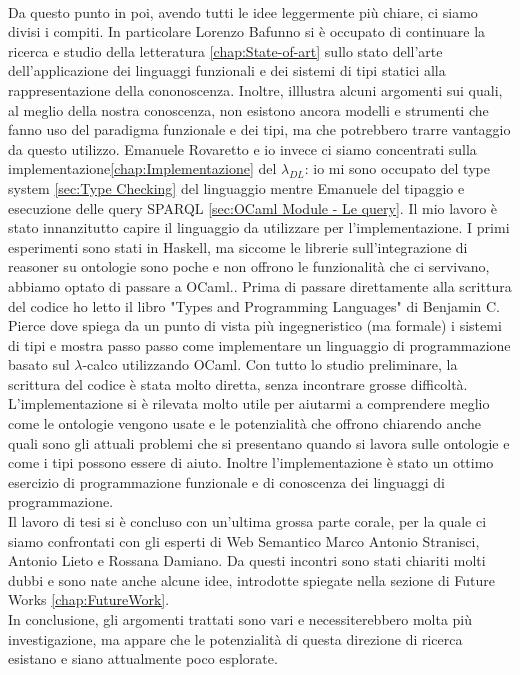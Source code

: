 \\Da questo punto in poi, avendo tutti le idee leggermente più chiare, ci siamo divisi i compiti. In particolare Lorenzo Bafunno si
è occupato di continuare la ricerca e studio della letteratura \ref{chap:State-of-art} sullo stato dell'arte dell'applicazione dei linguaggi funzionali e dei sistemi di tipi statici alla rappresentazione della cononoscenza. Inoltre, illlustra alcuni argomenti sui quali, al meglio della nostra conoscenza, non esistono ancora modelli e strumenti che fanno uso del paradigma funzionale e dei tipi, ma che potrebbero trarre vantaggio da questo utilizzo. 
Emanuele Rovaretto e io invece ci siamo concentrati sulla implementazione\ref{chap:Implementazione}
del $\lambda_{DL}$: io mi sono occupato del type system \ref{sec:Type Checking} del linguaggio mentre Emanuele del tipaggio e esecuzione delle query SPARQL \ref{sec:OCaml Module - Le query}.
Il mio lavoro è stato innanzitutto capire il linguaggio da utilizzare per l'implementazione. I primi esperimenti sono stati in Haskell, ma siccome le librerie
sull'integrazione di reasoner su ontologie sono poche e non offrono le funzionalità che ci servivano, abbiamo optato di passare a OCaml.. 
Prima di passare direttamente alla scrittura del codice ho letto il libro "Types and Programming Languages" \cite{TypesAndProgrammingLanguages} di Benjamin C. Pierce dove spiega da un punto di vista
più ingegneristico (ma formale) i sistemi di tipi e mostra passo passo come implementare un linguaggio di programmazione basato sul $\lambda$-calco utilizzando OCaml.
Con tutto lo studio preliminare, la scrittura del codice è stata molto diretta, senza incontrare grosse difficoltà.
\\L'implementazione si è rilevata molto utile per aiutarmi a comprendere meglio come le ontologie vengono usate e le potenzialità che offrono chiarendo anche
quali sono gli attuali problemi che si presentano quando si lavora sulle ontologie e come i tipi possono essere di aiuto. Inoltre l'implementazione è stato un ottimo
esercizio di programmazione funzionale e di conoscenza dei linguaggi di programmazione.
\\Il lavoro di tesi si è concluso con un'ultima grossa parte corale, per la quale ci siamo confrontati con gli esperti
di Web Semantico Marco Antonio Stranisci, Antonio Lieto e Rossana Damiano. Da questi incontri sono stati chiariti molti dubbi e sono nate anche alcune idee, introdotte
spiegate nella sezione di Future Works \ref{chap:FutureWork}.
\\In conclusione, gli argomenti trattati sono vari e necessiterebbero molta più investigazione, ma appare che le potenzialità di questa direzione di ricerca esistano e siano attualmente poco esplorate. 